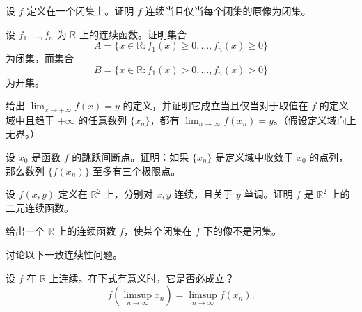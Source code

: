 \noindent\begin{minipage}{\textwidth}
设 $f$ 定义在一个闭集上。证明 $f$ 连续当且仅当每个闭集的原像为闭集。
\end{minipage}\par\vfill
\noindent\begin{minipage}{\textwidth}
设 $f_1,\ldots,f_n$ 为 $\mathbb R$ 上的连续函数。证明集合\[A=\{x\in\mathbb R:f_1(x)\ge0,\ldots,f_n(x)\ge0\}\]为闭集，而集合\[B=\{x\in\mathbb R:f_1(x)>0,\ldots,f_n(x)>0\}\]为开集。
\end{minipage}\par\vfill
\newpage
\noindent\begin{minipage}{\textwidth}
给出 $\lim_{x\to+\infty}f(x)=y$ 的定义，并证明它成立当且仅当对于取值在 $f$ 的定义域中且趋于 $+\infty$ 的任意数列 $\{x_n\}$，都有 $\lim_{n\to\infty}f(x_n)=y$。（假设定义域向上无界。）
\end{minipage}\par\vfill
\noindent\begin{minipage}{\textwidth}
设 $x_0$ 是函数 $f$ 的跳跃间断点。证明：如果 $\{x_n\}$ 是定义域中收敛于 $x_0$ 的点列，那么数列 $\{f(x_n)\}$ 至多有三个极限点。
\end{minipage}\par\vfill
\noindent\begin{minipage}{\textwidth}
设 $f(x,y)$ 定义在 $\mathbb R^2$ 上，分别对 $x,y$ 连续，且关于 $y$ 单调。证明 $f$ 是 $\mathbb R^2$ 上的二元连续函数。
\end{minipage}\par\vfill
\noindent\begin{minipage}{\textwidth}
给出一个 $\mathbb R$ 上的连续函数 $f$，使某个闭集在 $f$ 下的像不是闭集。
\end{minipage}\par\vfill
\newpage
\noindent\begin{minipage}{\textwidth}
讨论以下一致连续性问题。
\end{minipage}\par\vfill
\noindent\begin{minipage}{\textwidth}
设 $f$ 在 $\mathbb R$ 上连续。在下式有意义时，它是否必成立？\[f\left(\limsup_{n\to\infty}x_n\right)=\limsup_{n\to\infty}f(x_n).\]
\end{minipage}\par\vfill
